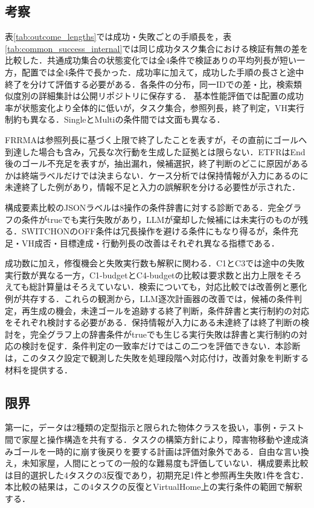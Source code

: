 \subsection{考察}\label{sec5.5}
表\ref{tab:outcome_lengths}では成功・失敗ごとの手順長を，表\ref{tab:common_success_internal}では同じ成功タスク集合における検証有無の差を比較した．共通成功集合の状態変化では全4条件で検証ありの平均列長が短い一方，配置では全4条件で長かった．成功率に加えて，成功した手順の長さと途中終了を分けて評価する必要がある．各条件の分布，同一IDでの差・比，検索類似度別の詳細集計は公開リポジトリに保存する．
基本性能評価では配置の成功率が状態変化より全体的に低いが，タスク集合，参照列長，終了判定，VH実行制約も異なる．SingleとMultiの条件間では文面も異なる．

FRRMAは参照列長に基づく上限で終了したことを表すが，その直前にゴールへ到達した場合も含み，冗長な次行動を生成した証拠とは限らない．ETFRはEnd後のゴール不充足を表すが，抽出漏れ，候補選択，終了判断のどこに原因があるかは終端ラベルだけでは決まらない．ケース分析では保持情報が入力にあるのに未達終了した例があり，情報不足と入力の誤解釈を分ける必要性が示された．

構成要素比較のJSONラベルは8操作の条件辞書に対する診断である．完全グラフの条件がtrueでも実行失敗があり，LLMが棄却した候補には未実行のものが残る．SWITCHONのOFF条件は冗長操作を避ける条件にもなり得るが，条件充足・VH成否・目標達成・行動列長の改善はそれぞれ異なる指標である．

成功数に加え，修復機会と失敗実行数も解釈に関わる．C1とC3では途中の失敗実行数が異なる一方，C1-budgetとC4-budgetの比較は要求数と出力上限をそろえても総計算量はそろえていない．検索についても，対応比較では改善例と悪化例が共存する．これらの観測から，LLM逐次計画器の改善では，候補の条件判定，再生成の機会，未達ゴールを追跡する終了判断，条件辞書と実行制約の対応をそれぞれ検討する必要がある．保持情報が入力にある未達終了は終了判断の検討を，完全グラフ上の辞書条件がtrueでも生じる実行失敗は辞書と実行制約の対応の検討を促す．条件判定の一致率だけではこの二つを評価できない．本診断は，このタスク設定で観測した失敗を処理段階へ対応付け，改善対象を判断する材料を提供する．


\subsection{限界} \label{sec5.6}
第一に，データは2種類の定型指示と限られた物体クラスを扱い，事例・テスト間で家屋と操作構造を共有する．タスクの構築方針により，障害物移動や達成済みゴールを一時的に崩す後戻りを要する計画は評価対象外である．自由な言い換え，未知家屋，人間にとっての一般的な難易度も評価していない．構成要素比較は目的選択した4タスクの3反復であり，初期充足1件と参照再生失敗1件を含む．本比較の結果は，この4タスクの反復とVirtualHome上の実行条件の範囲で解釈する．

